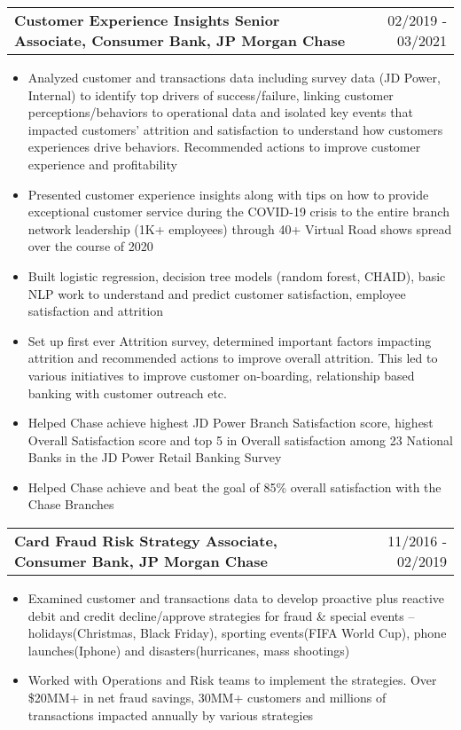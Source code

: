 \documentclass[a4paper,20pt]{article}
\makeatletter
\newcommand{\resumeSubheading}[2]{
  \vspace{1pt}\item
    \begin{tabular*}{0.97\textwidth}{l@{\extracolsep{\fill}}r}
      \textbf{#1} & #2 \\
    \end{tabular*}\vspace{1pt}
}
\makeatother
\begin{document}
\vspace{1pt}
     \resumeSubheading{Customer Experience Insights Senior Associate, Consumer Bank, JP Morgan Chase}{02/2019 - 03/2021}
\begin{itemize}
\item {Analyzed customer and transactions data including survey data (JD Power, Internal) to identify top drivers of success/failure, linking customer perceptions/behaviors to operational data and isolated key events that impacted customers’ attrition and satisfaction to understand how customers experiences drive behaviors. Recommended actions to improve customer experience and profitability}
\vspace{1pt}
\item {Presented customer experience insights along with tips on how to provide exceptional customer service during the COVID-19 crisis to the entire branch network leadership (1K+ employees) through 40+ Virtual Road shows spread over the course of 2020}
\vspace{1pt}
\item {Built logistic regression, decision tree models (random forest, CHAID), basic NLP work to understand and predict customer satisfaction, employee satisfaction and attrition}
\vspace{1pt}
\item {Set up first ever Attrition survey, determined important factors impacting attrition and recommended actions to improve overall attrition. This led to various initiatives to improve customer on-boarding, relationship based banking with customer outreach etc.}
\vspace{1pt}
\item {Helped Chase achieve highest JD Power Branch Satisfaction score, highest Overall Satisfaction score and top 5 in Overall satisfaction among 23 National Banks in the JD Power Retail Banking Survey}
\vspace{1pt}
\item {Helped Chase achieve and beat the goal of 85\% overall satisfaction with the Chase Branches}
\end{itemize}


\vspace{1pt}
     \resumeSubheading{Card Fraud Risk Strategy Associate, Consumer Bank, JP Morgan Chase}{11/2016 - 02/2019}
\begin{itemize}
\item {Examined customer and transactions data to develop proactive plus reactive debit and credit decline/approve strategies for fraud \& special events – holidays(Christmas, Black Friday), sporting events(FIFA World Cup), phone launches(Iphone) and disasters(hurricanes, mass shootings)}
\item {Worked with Operations and Risk teams to implement the strategies. Over \$20MM+ in net fraud savings, 30MM+ customers and millions of transactions impacted annually by various strategies}
\end{itemize}
\end{document}
